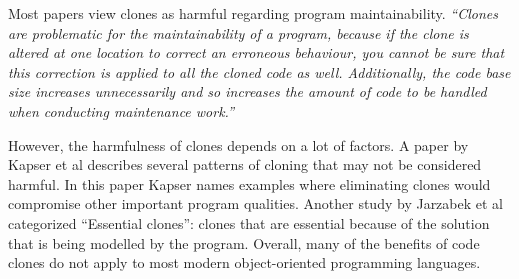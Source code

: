 Most papers view clones as harmful regarding program maintainability. \textit{``Clones are problematic for the maintainability of a program, because if the clone is altered at one location to correct an erroneous behaviour, you cannot be sure that this correction is applied to all the cloned code as well. Additionally, the code base size increases unnecessarily and so increases the amount of code to be handled when conducting maintenance work.''} \cite{ostberg2014automatically}

However, the harmfulness of clones depends on a lot of factors. A paper by Kapser et al \cite{kapser2006cloning} describes several patterns of cloning that may not be considered harmful. In this paper Kapser names examples where eliminating clones would compromise other important program qualities. Another study by Jarzabek et al \cite{jarzabek2010clones} categorized ``Essential clones'': clones that are essential because of the solution that is being modelled by the program. Overall, many of the benefits of code clones do not apply to most modern object-oriented programming languages.
